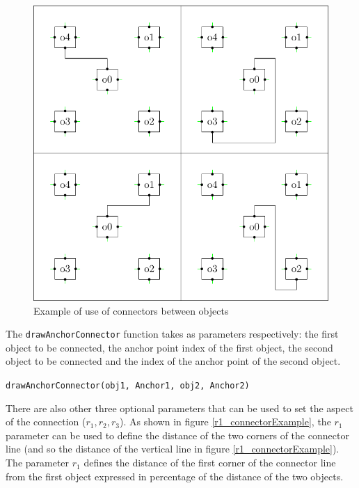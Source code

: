 \documentclass[a4paper,12pt]{report}
\begin{document}
\begin{figure}[ht]
  \centering
  \includegraphics[width=1.0\textwidth]{N-S}
  \caption{Example of use of connectors between objects}
  \label{connectorExample}
\end{figure}

The \texttt{drawAnchorConnector} function takes as parameters respectively: the first object to be connected, the anchor point index of the first object, the second object to be connected and the index of the anchor point of the second object.

\texttt{drawAnchorConnector(obj1, Anchor1, obj2, Anchor2)}

There are also other three optional parameters that can be used to set the aspect of the connection ($r_1,r_2,r_3$). As shown in figure \ref{r1_connectorExample}, the $r_1$ parameter can be used to define the distance of the two corners of the connector line (and so the distance of the vertical line in figure \ref{r1_connectorExample}). The parameter $r_1$ defines the distance of the first corner of the connector line from the first object expressed in percentage of the distance of the two objects.
\end{document}
